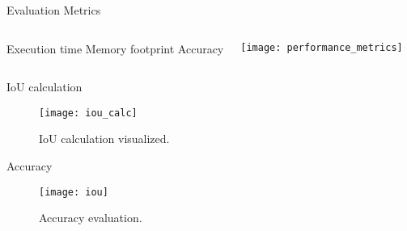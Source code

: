 \begin{frame}[t]{Evaluation Metrics} %
    \begin{columns}[c]
            \newline
            \newline
                Execution time
            \newline
            \newline
                Memory footprint
            \newline
            \newline
                Accuracy
           
        \begin{flushright}
            \texttt{[image: performance\_metrics]}
        \end{flushright} 
    \end{columns}
\end{frame}


\begin{frame}[t]{IoU calculation} 
    \begin{figure}
           \texttt{[image: iou\_calc]}
           \caption{IoU calculation visualized. \cite{ioucalc}}
        \end{figure}
\end{frame}


\begin{frame}[t]{Accuracy} %
    \begin{figure}
        \centering
        
       \texttt{[image: iou]}
       \caption{Accuracy evaluation. \cite{IoU}}
    \end{figure}
\end{frame}
